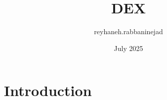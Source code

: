 \documentclass{article}
\title{DEX}
\author{reyhaneh.rabbaninejad }
\date{July 2025}
\begin{document}
\maketitle

\section{Introduction}
\end{document}
